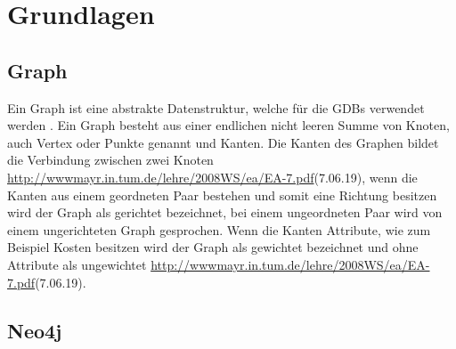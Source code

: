 
\chapter{Grundlagen} %

\label{Kaptiel2} %


\section{Graph}

Ein Graph ist eine abstrakte Datenstruktur, welche für die GDBs verwendet werden \parencite{vicknair2010comparison}. Ein Graph besteht aus einer endlichen nicht leeren Summe von Knoten, auch Vertex oder Punkte genannt und Kanten. Die Kanten des Graphen bildet die Verbindung zwischen zwei Knoten \url{ http://wwwmayr.in.tum.de/lehre/2008WS/ea/EA-7.pdf}(7.06.19), wenn die Kanten aus einem geordneten Paar bestehen und somit eine Richtung besitzen wird der Graph als gerichtet bezeichnet, bei einem ungeordneten Paar wird von einem ungerichteten Graph gesprochen\parencite{bondy1976graph}. Wenn die Kanten Attribute, wie zum Beispiel Kosten besitzen wird der Graph als gewichtet bezeichnet und ohne Attribute als ungewichtet  \url{ http://wwwmayr.in.tum.de/lehre/2008WS/ea/EA-7.pdf}(7.06.19). 

\section{Neo4j}

